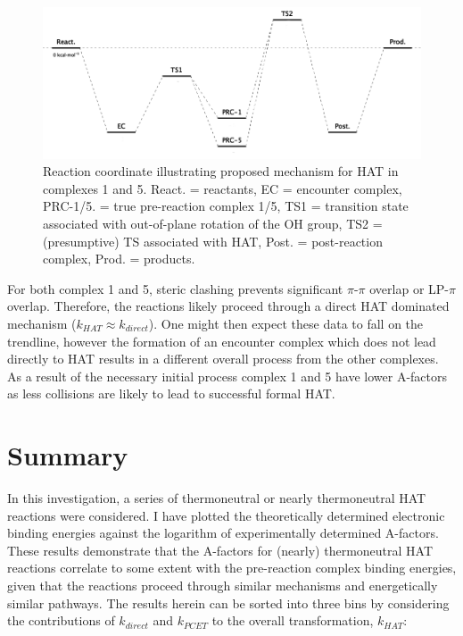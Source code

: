 
\begin{figure}[!htbp]
  \centering
  \includegraphics[width=\textwidth]{figures/encounter-pes.png}
  \caption[Reaction coordinate illustrating proposed mechanism for HAT in
  complexes 1 and 5.]{Reaction coordinate illustrating proposed mechanism for
  HAT in complexes 1 and 5. React. = reactants, EC = encounter complex,
  PRC-1/5. = true pre-reaction complex 1/5, TS1 = transition state associated
  with out-of-plane rotation of the OH group, TS2 = (presumptive) TS associated
  with HAT, Post. = post-reaction complex, Prod. = products.}
  \label{fig:encounter-pes}
\end{figure}

For both complex 1 and 5, steric clashing prevents significant $\pi$-$\pi$
overlap or LP-$\pi$ overlap. Therefore, the reactions likely proceed through a
direct HAT dominated mechanism ($k_{HAT} \approx k_{direct}$). One might then
expect these data to fall on the trendline, however the formation of an
encounter complex which does not lead directly to HAT results in a different
overall process from the other complexes. As a result of the necessary initial
process complex 1 and 5 have lower A-factors as less collisions are likely to
lead to successful formal HAT.


\section{Summary}

In this investigation, a series of thermoneutral or nearly thermoneutral HAT
reactions were considered. I have plotted the theoretically determined
electronic binding energies against the logarithm of experimentally determined
A-factors. These results demonstrate that the A-factors for (nearly)
thermoneutral HAT reactions correlate to some extent with the pre-reaction
complex binding energies, given that the reactions proceed through similar
mechanisms and energetically similar pathways. The results herein can be sorted
into three bins by considering the contributions of $k_{direct}$ and $k_{PCET}$
to the overall transformation, $k_{HAT}$:

